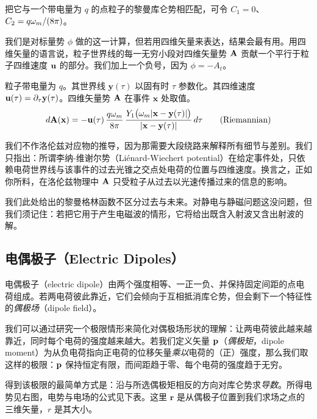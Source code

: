 把它与一个带电量为 $q$ 的点粒子的黎曼库仑势相匹配，可令 $C_{1}=0$、$C_{2}=q\omega_m/(8\pi)$。

我们是对标量势 $\phi$ 做的这一计算，但若用四维矢量来表达，结果会最有用。用四维矢量的语言说，粒子世界线的每一无穷小段对四维矢量势 $\mathbf{A}$ 贡献一个平行于粒子四维速度 $\mathbf{u}$ 的部分。我们加上一个负号，因为 $\phi = -A_{t}$。

\begin{keybox}[格林函数]
粒子带电量为 $q$。其世界线 $\mathbf{y}(\tau)$ 以固有时 $\tau$ 参数化。其四维速度 $\mathbf{u}(\tau) = \partial_{\tau}\mathbf{y}(\tau)$。四维矢量势 $\mathbf{A}$ 在事件 $\mathbf{x}$ 处取值。
\begin{equation}
d\mathbf{A}(\mathbf{x}) = -\mathbf{u}(\tau)\,\frac{q\omega_m}{8\pi}\,
\frac{Y_{1}\bigl(\omega_m|\mathbf{x}-\mathbf{y}(\tau)|\bigr)}{|\mathbf{x}-\mathbf{y}(\tau)|}\,d\tau \tag{Riemannian}
\end{equation}
\end{keybox}

我们不作洛伦兹对应物的推导，因为那需要大段绕路来解释所有细节与差别。我们只指出：所谓李纳-维谢尔势（Liénard-Wiechert potential）在给定事件处，只依赖电荷世界线与该事件的过去光锥之交点处电荷的位置与四维速度。换言之，正如你所料，在洛伦兹物理中 $\mathbf{A}$ 只受粒子从过去以光速传播过来的信息的影响。

我们此处给出的黎曼格林函数不区分过去与未来。对静电与静磁问题这没问题，但我们须记住：若把它用于产生电磁波的情形，它将给出既含入射波又含出射波的解。

\subsection{电偶极子（Electric Dipoles）}

电偶极子（electric dipole）由两个强度相等、一正一负、并保持固定间距的点电荷组成。若两电荷彼此靠近，它们会倾向于互相抵消库仑势，但会剩下一个特征性的\emph{偶极场}（dipole field）。


我们可以通过研究一个极限情形来简化对偶极场形状的理解：让两电荷彼此越来越靠近，同时每个电荷的强度越来越大。若我们定义矢量 $\mathbf{p}$（\emph{偶极矩}，dipole moment）为从负电荷指向正电荷的位移矢量\emph{乘以}电荷的（正）强度，那么我们取这样的极限：$\mathbf{p}$ 保持恒定有限，而间距趋于零、每个电荷的强度趋于无穷。

得到该极限的最简单方式是：沿与所选偶极矩相反的方向对库仑势求\emph{导数}。所得电势见右图，电势与电场的公式见下表。这里 $\mathbf{r}$ 是从偶极子位置到我们求场之点的三维矢量，$r$ 是其大小。

